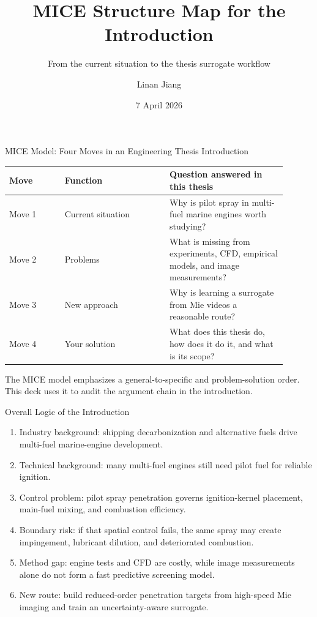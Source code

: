 \documentclass[aspectratio=169,11pt]{beamer}
\title[MICE Introduction Map]{MICE Structure Map for the Introduction}
\subtitle{From the current situation to the thesis surrogate workflow}
\author{Linan Jiang}
\institute{Aalto University}
\date{7 April 2026}
\newcommand{\claim}[1]{\textcolor{blue!65!black}{#1}}
\newcommand{\gaptext}[1]{\textcolor{red!65!black}{#1}}
\newcommand{\solutiontext}[1]{\textcolor{green!45!black}{#1}}
\begin{document}
\begin{frame}
  \titlepage
\end{frame}

\begin{frame}{MICE Model: Four Moves in an Engineering Thesis Introduction}
\small
\begin{tabular}{L{0.18\linewidth}L{0.34\linewidth}L{0.38\linewidth}}
\toprule
Move & Function & Question answered in this thesis \\
\midrule
Move 1 & Current situation & Why is pilot spray in multi-fuel marine engines worth studying? \\
Move 2 & Problems & What is missing from experiments, CFD, empirical models, and image measurements? \\
Move 3 & New approach & Why is learning a surrogate from Mie videos a reasonable route? \\
Move 4 & Your solution & What does this thesis do, how does it do it, and what is its scope? \\
\bottomrule
\end{tabular}

\vspace{0.7em}
\footnotesize
The MICE model emphasizes a general-to-specific and problem-solution order. This deck uses it to audit the argument chain in the introduction.
\end{frame}

\begin{frame}{Overall Logic of the Introduction}
\small
\begin{enumerate}
  \item \claim{Industry background}: shipping decarbonization and alternative fuels drive multi-fuel marine-engine development.
  \item \claim{Technical background}: many multi-fuel engines still need pilot fuel for reliable ignition.
  \item \gaptext{Control problem}: pilot spray penetration governs ignition-kernel placement, main-fuel mixing, and combustion efficiency.
  \item \gaptext{Boundary risk}: if that spatial control fails, the same spray may create impingement, lubricant dilution, and deteriorated combustion.
  \item \gaptext{Method gap}: engine tests and CFD are costly, while image measurements alone do not form a fast predictive screening model.
  \item \solutiontext{New route}: build reduced-order penetration targets from high-speed Mie imaging and train an uncertainty-aware surrogate.
\end{enumerate}
\end{frame}
\end{document}
